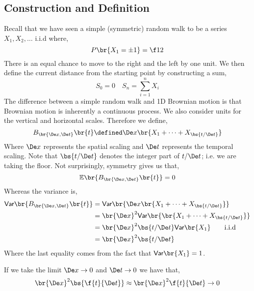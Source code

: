\documentclass{article}
\newcommand{\Var}{\textsf{Var}}
\newcommand{\Exp}{\mathbb{E}}
\begin{document}
    \subsection{Construction and Definition}
    Recall that we have seen a simple (symmetric) random walk to be a series $X_1, X_2, \ldots$ i.i.d where,
    \[ P\br{X_1 = \pm 1} = \f12 \]
    There is an equal chance to move to the right and the left by one unit. We then define the current distance from the starting point by constructing a sum,
    \[ S_0 = 0  \quad S_n = \sum_{i = 1}^{n} X_i \]
    The difference between a simple random walk and 1D Brownian motion is that Brownian motion is inherently a continuous process. We also consider units for the vertical and horizontal scales. Therefore we define,
    \[ B_{\br{\De x, \De t}}\br{t} \defined \De x \br{X_1 + \cdots + X_{\bs{t / \De t}}} \]
    Where $\De x$ represents the spatial scaling and $\De t$ represents the temporal scaling. Note that $\bs{t / \De t}$ denotes the integer part of $t / \De t$; i.e. we are taking the floor. Not surprisingly, symmetry gives us that,
    \[ \Exp\br{B_{\br{\De x, \De t}}\br{t}} = 0 \]
    Whereas the variance is,
    \begin{align*}
        \Var\br{B_{\br{\De x, \De t}}\br{t}}
        &= \Var\br{\De x \br{X_1 + \cdots + X_{\bs{t / \De t}}}} \\
        &= \br{\De x }^2\Var\br{\br{X_1 + \cdots + X_{\bs{t / \De t}}}} \\
        &= \br{\De x }^2\bs{t / \De t}\Var\br{X_1} \qquad \text{i.i.d}\\
        &= \br{\De x }^2\bs{t / \De t}
    \end{align*}
    Where the last equality comes from the fact that $\Var\br{X_1} = 1$.
    \begin{center}
    \end{center}
    If we take the limit $\De x \to 0$ and $\De t \to 0$ we have that,
    \[ \br{\De x }^2\bs{\f{t}{\De t}} \approx \br{\De x }^2{\f{t}{\De t}} \to 0 \]
\end{document}

